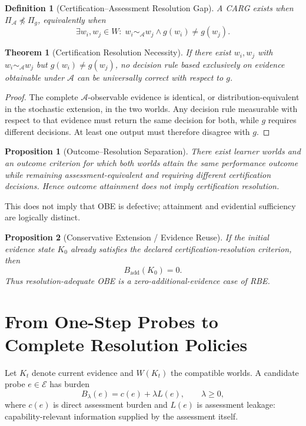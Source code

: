 \documentclass[11pt]{article}
\newtheorem{theorem}{Theorem}
\newtheorem{definition}{Definition}
\newtheorem{proposition}{Proposition}
\newcommand{\cA}{\mathcal{A}}\newcommand{\cE}{\mathcal{E}}\newcommand{\RBE}{\textsc{RBE}}
\begin{document}
\begin{definition}[Certification--Assessment Resolution Gap]
A CARG exists when $\Pi_{\cA}\npreceq\Pi_g$, equivalently when
\[
\exists w_i,w_j\in W:\; w_i\sim_{\cA}w_j\land g(w_i)\neq g(w_j).
\]
\end{definition}

\begin{theorem}[Certification Resolution Necessity]
If there exist $w_i,w_j$ with $w_i\sim_{\cA}w_j$ but $g(w_i)\neq g(w_j)$, no decision rule based exclusively on evidence obtainable under $\cA$ can be universally correct with respect to $g$.
\end{theorem}
\begin{proof}
The complete $\cA$-observable evidence is identical, or distribution-equivalent in the stochastic extension, in the two worlds. Any decision rule measurable with respect to that evidence must return the same decision for both, while $g$ requires different decisions. At least one output must therefore disagree with $g$.
\end{proof}

\begin{proposition}[Outcome--Resolution Separation]
There exist learner worlds and an outcome criterion for which both worlds attain the same performance outcome while remaining assessment-equivalent and requiring different certification decisions. Hence outcome attainment does not imply certification resolution.
\end{proposition}
This does not imply that OBE is defective; attainment and evidential sufficiency are logically distinct.

\begin{proposition}[Conservative Extension / Evidence Reuse]
If the initial evidence state $K_0$ already satisfies the declared certification-resolution criterion, then
\[
B_{\mathrm{add}}(K_0)=0.
\]
Thus resolution-adequate OBE is a zero-additional-evidence case of RBE.
\end{proposition}

\section{From One-Step Probes to Complete Resolution Policies}
Let $K_t$ denote current evidence and $W(K_t)$ the compatible worlds. A candidate probe $e\in\cE$ has burden
\[
B_\lambda(e)=c(e)+\lambda L(e),\qquad \lambda\ge0,
\]
where $c(e)$ is direct assessment burden and $L(e)$ is assessment leakage: capability-relevant information supplied by the assessment itself.
\end{document}
